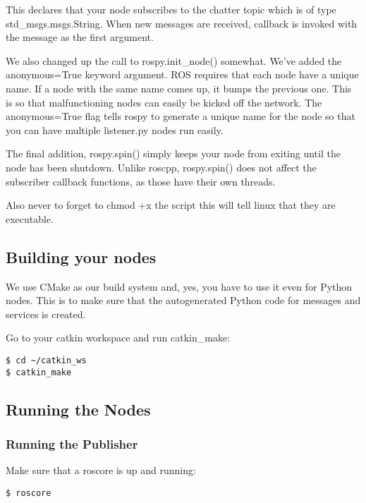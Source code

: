 This declares that your node subscribes to the chatter topic which is of type std\_msgs.msgs.String. When new messages are received, callback is invoked with the message as the first argument.

We also changed up the call to rospy.init\_node() somewhat. We've added the anonymous=True keyword argument. ROS requires that each node have a unique name. If a node with the same name comes up, it bumps the previous one. This is so that malfunctioning nodes can easily be kicked off the network. The anonymous=True flag tells rospy to generate a unique name for the node so that you can have multiple listener.py nodes run easily.

The final addition, rospy.spin() simply keeps your node from exiting until the node has been shutdown. Unlike roscpp, rospy.spin() does not affect the subscriber callback functions, as those have their own threads.

Also never to forget to chmod +x the script this will tell linux that they are executable.

\subsection{Building your nodes}

We use CMake as our build system and, yes, you have to use it even for Python nodes. This is to make sure that the autogenerated Python code for messages and services is created.



Go to your catkin workspace and run catkin\_make:

\begin{lstlisting}[breaklines=true languages=bash]
$ cd ~/catkin_ws
$ catkin_make
\end{lstlisting}

\subsection{Running the Nodes}
\subsubsection{Running the Publisher}

Make sure that a roscore is up and running:

\begin{lstlisting}[breaklines=true languages=bash]
$ roscore
\end{lstlisting}

